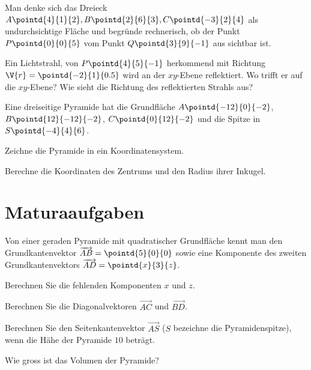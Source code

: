 \documentclass[%
11pt,%
twoside,%
titlepage,%
german,%
headsepline%
]{scrartcl}
\begin{document}
\begin{ueb}[sichtbar?]
Man denke sich das Dreieck $A\pointd{4}{1}{2}, B\pointd{2}{6}{3}, C\pointd{-3}{2}{4}$ als undurchsichtige Fläche und begründe rechnerisch, ob der Punkt $P\pointd{0}{0}{5}$ vom Punkt $Q\pointd{3}{9}{-1}$ aus sichtbar ist.
\end{ueb}

\begin{ueb}[Reflexion]
Ein Lichtstrahl, von $P\pointd{4}{5}{-1}$ herkommend mit Richtung $\V{r}=\pointd{-2}{1}{0.5}$ wird an der $xy$-Ebene reflektiert. Wo trifft er auf die $xy$-Ebene? Wie sieht die Richtung des reflektierten Strahls aus?
\end{ueb}

\begin{ueb}[Pyramide]
Eine
dreiseitige Pyramide hat die Grundfläche $A\pointd{-12}{0}{-2}$, $B\pointd{12}{-12}{-2}$, $C\pointd{0}{12}{-2}$ und die Spitze in $S\pointd{-4}{4}{6}$.
\begin{enumeratea}
\item Zeichne die Pyramide in ein Koordinatensystem.
\item Berechne die Koordinaten des Zentrums und den Radius ihrer Inkugel.
\end{enumeratea}
\end{ueb}

\clearpage

\appendix

\section{Maturaaufgaben}
\begin{ueb}
Von einer geraden Pyramide mit quadratischer Grundfläche kennt man den Grundkantenvektor $\overrightarrow{AB}=\pointd{5}{0}{0}$ sowie eine Komponente des zweiten Grundkantenvektors $\overrightarrow{AD}=\pointd{x}{3}{z}$.
\begin{enumeratea}
\item Berechnen Sie die fehlenden Komponenten $x$ und $z$.
\item Berechnen Sie die Diagonalvektoren $\overrightarrow{AC}$ und $\overrightarrow{BD}$.
\item Berechnen Sie den Seitenkantenvektor $\overrightarrow{AS}$ ($S$ bezeichne die Pyramidenspitze), wenn die Hähe der Pyramide $10$ beträgt.
\item Wie gross ist das Volumen der Pyramide?
\end{enumeratea}
\end{ueb}
\end{document}

